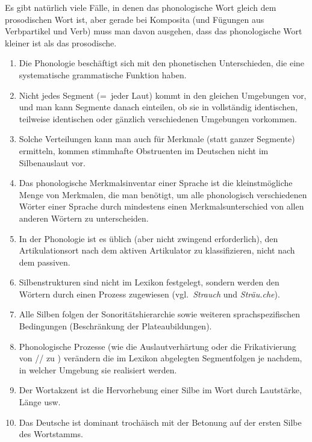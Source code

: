 Es gibt natürlich viele Fälle, in denen das phonologische Wort gleich dem prosodischen Wort ist, aber gerade bei Komposita (und \zB Fügungen aus Verbpartikel und Verb) muss man davon ausgehen, dass das phonologische Wort kleiner ist als das prosodische.

\Zusammenfassung

\begin{enumerate}
  \item Die Phonologie beschäftigt sich mit den phonetischen Unterschieden, die eine systematische grammatische Funktion haben.
  \item Nicht jedes Segment (=~jeder Laut) kommt in den gleichen Umgebungen vor, und man kann Segmente danach einteilen, ob sie in vollständig identischen, teilweise identischen oder gänzlich verschiedenen Umgebungen vorkommen.
  \item Solche Verteilungen kann man auch für Merkmale (statt ganzer Segmente) ermitteln, \zB kommen stimmhafte Obstruenten im Deutschen nicht im Silbenauslaut vor.
  \item Das phonologische Merk\-mals\-in\-ventar einer Sprache ist die kleinstmögliche Menge von Merkmalen, die man benötigt, um alle phonologisch verschiedenen Wörter einer Sprache durch mindestens einen Merk\-mals\-unter\-schied von allen anderen Wörtern zu unterscheiden.
  \item In der Phonologie ist es üblich (aber nicht zwingend erforderlich), den Artikulationsort nach dem aktiven Artikulator zu klassifizieren, nicht nach dem passiven.
  \item Silbenstrukturen sind nicht im Lexikon festgelegt, sondern werden den Wörtern durch einen Prozess zugewiesen (vgl.\ \textit{Strauch} und \textit{Sträu.che}).
  \item Alle Silben folgen der Sonoritätshierarchie sowie weiteren sprachspezifischen Bedingungen (\zB Beschränkung der Plateaubildungen).
  \item Phonologische Prozesse (wie die Auslautverhärtung oder die Frikativierung von // zu \textipa{[i\c{c}]}) verändern die im Lexikon abgelegten Segmentfolgen je nachdem, in welcher Umgebung sie realisiert werden.
  \item Der Wortakzent ist die Hervorhebung einer Silbe im Wort durch Lautstärke, Länge usw.
  \item Das Deutsche ist dominant trochäisch mit der Betonung auf der ersten Silbe des Wortstamms.
\end{enumerate}

